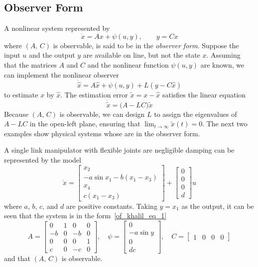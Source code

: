 \documentclass[12pt,a4paper,oneside]{book}
\begin{document}
\begin{onehalfspace}
\section{Observer Form}
A nonlinear system represented by
\begin{equation}\label{of_khalil_eq_1}
	\dot{x}=Ax+\psi(u,y),\qquad y=Cx
\end{equation}
where $(A,\,C)$ is observable, is said to be in the \textit{observer form}. Suppose the input $u$ and the output $y$ are available on line, but not the state $x$. Assuming that the matrices $A$ and $C$ and the nonlinear function $\psi(u,y)$ are known, we can implement the nonlinear observer
\begin{equation}
	\dot{\hat{x}}=A\hat{x}+\psi(u,y)+L(y-C\hat{x})
\end{equation}
to estimate $x$ by $\hat{x}$. The estimation error $\tilde{x}=x-\hat{x}$ satisfies the linear equation
\begin{equation*}
	\dot{\tilde{x}}=\Big(A-LC\Big)\tilde{x}
\end{equation*}
Because $(A,\,C)$ is observable, we can design $L$ to assign the eigenvalues of $A-LC$ in the open-left plane, ensuring that $\lim_{t\rightarrow\infty}\tilde{x}(t)=0$. The next two examples show physical systems whose are in the observer form.
\begin{example}
	A single link manipulator with flexible joints are negligible damping can be represented by the model 
	\begin{equation*}
		\dot{x}=\begin{bmatrix} x_2 \\[6pt] -a\sin x_1-b(x_1-x_3) \\[6pt] x_4 \\[6pt] c(x_1-x_3) \end{bmatrix} + \begin{bmatrix} 0 \\[6pt] 0 \\[6pt] 0 \\[6pt] d \end{bmatrix}u
	\end{equation*}
	where $a$, $b$, $c$, and $d$ are positive constants. Taking $y=x_1$ as the output, it can be seen that the system is in the form~\eqref{of_khalil_eq_1} 
	\begin{equation*} A=\begin{bmatrix} 0& 1&0&0 \\[6pt] -b&0&-b&0 \\[6pt] 0&0&0&1 \\[6pt] c&0&-c&0\end{bmatrix},\quad\psi=\begin{bmatrix} 0 \\[6pt] -a\sin y \\[6pt] 0 \\[6pt] dc \end{bmatrix},\quad C=\begin{bmatrix} 1&0&0&0 \end{bmatrix} 
	\end{equation*}
	and that $(A,\,C)$ is observable.
	

\end{example}
\end{onehalfspace}
\end{document}
